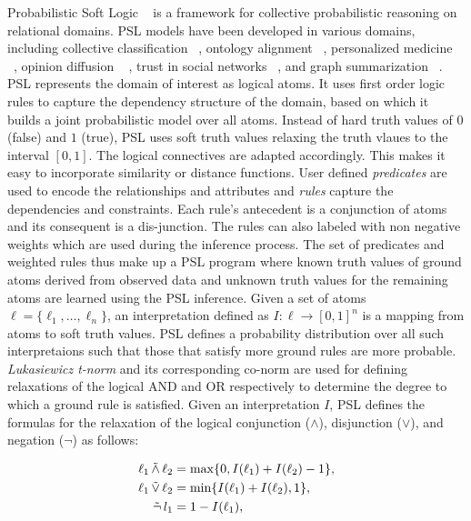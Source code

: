 Probabilistic Soft Logic ~\cite{kimmig2012short} is a framework for collective probabilistic reasoning on relational domains.
PSL models have been developed in various domains, including collective classification ~\cite{broecheler2010computing}, ontology alignment ~\cite{brocheler2012probabilistic}, personalized medicine ~\cite{bach2010decision}, opinion diffusion ~\cite{bach2012scaling} , trust in social networks ~\cite{huang2012probabilistic}, and graph summarization ~\cite{memory2012graph}.
PSL represents the domain of interest as logical atoms.
It uses first order logic rules to capture the dependency structure of the domain, based on which it builds a joint probabilistic model over all atoms.
Instead of hard truth values of $0$ (false) and $1$ (true), PSL uses soft truth values relaxing the truth vlaues to the interval $[0,1]$.
The logical connectives are adapted accordingly.
This makes it easy to incorporate similarity or distance functions.
\newline
User defined \emph{predicates} are used to encode the relationships and attributes and \emph{rules} capture the  dependencies and constraints.
Each rule's antecedent is a conjunction of atoms and its consequent is a dis-junction. 
The rules can also labeled with non negative weights which are used during the inference process. 
The set of predicates and weighted rules thus make up a PSL program where known truth values of ground atoms derived from observed data and unknown truth values for the remaining atoms are learned using the PSL inference.
\newline
Given a set of atoms 
$\ell = \{\ell_1,\ldots,\ell_n\}$,
an interpretation defined as 
$I : \ell \rightarrow [0,1]^n$
is a mapping from atoms to soft truth values.
PSL defines a probability distribution over all such interpretaions such that those that satisfy more ground rules are more probable.
\emph{Lukasiewicz t-norm} and its corresponding co-norm are used for defining relaxations of the logical AND and OR respectively to determine the degree to which a ground rule is satisfied.
Given an interpretation $\mathit{I}$, PSL defines the formulas for the relaxation of the logical conjunction ($\wedge$), disjunction ($\vee$), and negation ($\neg$) as follows:

\begin{align*}
\ell_1 \softand \ell_2 &= \max\{0, I(\ell_1) + I(\ell_2) - 1\},\\
\ell_1 \softor \ell_2 &= \min\{I(\ell_1) + I(\ell_2), 1\},\\
\softneg l_1 &= 1 - I(\ell_1),
\end{align*}  

